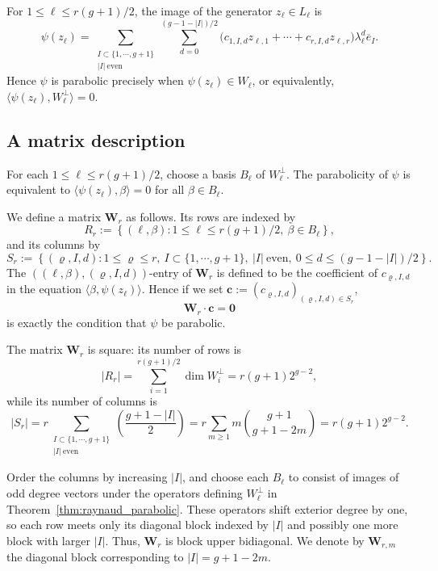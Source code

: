 \documentclass[12pt, letterpaper]{amsart}
\theoremstyle{definition}
\newcommand{\bc}{\mathbf{c} }
\newcommand{\bW}{\mathbf{W} }
\newcommand{\lbd}{\lambda}
\begin{document}
For \(1\le\ell\le r(g+1)/2\), the image of the generator \(z_\ell\in L_\ell\) is
\[
\psi(z_\ell)=\sum_{\substack{I\subset\{1,\cdots,g+1\}\\|I|\ \mathrm{even}}}\sum_{d=0}^{(g-1-|I|)/2}\bigl(c_{1,I,d}z_{\ell,1}+\cdots+c_{r,I,d}z_{\ell,r}\bigr)\lbd_\ell^d\overline e_I.
\]
Hence \(\psi\) is parabolic precisely when \(\psi(z_\ell)\in W_\ell\), or equivalently, \(\langle\psi(z_\ell), W_\ell^\perp\rangle=0.\)

\subsection{A matrix description}\label{ssec:matrix}

For each \(1\le\ell\le r(g+1)/2\), choose a basis \(B_\ell\) of \(W_\ell^\perp\). The parabolicity of \(\psi\) is equivalent to \(\langle\psi(z_\ell),\beta\rangle=0\) for all \(\beta\in B_\ell\).

We define a matrix \(\bW_r\) as follows. Its rows are indexed by
\[R_r:=\left\{(\ell,\beta): 1\le\ell\le r(g+1)/2,\ \beta\in B_\ell\right\},\]
and its columns by
\[S_r:=\left\{(\varrho,I,d):1\le\varrho\le r,\ I\subset\{1,\cdots,g+1\},\ |I|\ \text{even},\ 0\le d\le (g-1-|I|)/2\right\}.\]
The \(((\ell,\beta),(\varrho,I,d))\)-entry of \(\bW_r\) is defined to be the coefficient of \(c_{\varrho,I,d}\) in the equation \(\langle \beta,\psi(z_\ell)\rangle\). Hence if we set \(\bc := (c_{\varrho,I,d})_{(\varrho,I,d)\in S_r}\),
\begin{equation}\label{lin_cond}
\bW_r \cdot \bc=\mathbf{0}
\end{equation}
is exactly the condition that \(\psi\) be parabolic.

The matrix \(\bW_r\) is square: its number of rows is
\[|R_r|=\sum_{i=1}^{r(g+1)/2}\dim W_i^\perp=r(g+1)2^{g-2},\]
while its number of columns is
\[|S_r|=r\sum_{\substack{I\subset\{1,\cdots,g+1\}\\|I|\ \mathrm{even}}}\left(\frac{g+1-|I|}{2}\right)=r\sum_{m\ge1}m\binom{g+1}{g+1-2m}=r(g+1)2^{g-2}.\]

Order the columns by increasing \(|I|\), and choose each \(B_\ell\) to consist of images of odd degree vectors under the operators defining \(W_\ell^\perp\) in Theorem~\ref{thm:raynaud_parabolic}. These operators shift exterior degree by one, so each row meets only its diagonal block indexed by \(|I|\) and possibly one more block with larger \(|I|\). Thus, \(\bW_{r}\) is block upper bidiagonal. We denote by \(\bW_{r,m}\) the diagonal block corresponding to \(|I| = g + 1 - 2m\).
\end{document}
